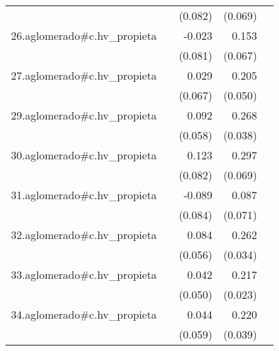 {\begin{longtable}{l*{4}{D{.}{.}{-1}}}
            &                     &     (0.082)         &     (0.069)         &                     \\
\addlinespace
26.aglomerado#c.hv\_propieta&                     &      -0.023         &       0.153\sym{*}  &                     \\
            &                     &     (0.081)         &     (0.067)         &                     \\
\addlinespace
27.aglomerado#c.hv\_propieta&                     &       0.029         &       0.205\sym{***}&                     \\
            &                     &     (0.067)         &     (0.050)         &                     \\
\addlinespace
29.aglomerado#c.hv\_propieta&                     &       0.092         &       0.268\sym{***}&                     \\
            &                     &     (0.058)         &     (0.038)         &                     \\
\addlinespace
30.aglomerado#c.hv\_propieta&                     &       0.123         &       0.297\sym{***}&                     \\
            &                     &     (0.082)         &     (0.069)         &                     \\
\addlinespace
31.aglomerado#c.hv\_propieta&                     &      -0.089         &       0.087         &                     \\
            &                     &     (0.084)         &     (0.071)         &                     \\
\addlinespace
32.aglomerado#c.hv\_propieta&                     &       0.084         &       0.262\sym{***}&                     \\
            &                     &     (0.056)         &     (0.034)         &                     \\
\addlinespace
33.aglomerado#c.hv\_propieta&                     &       0.042         &       0.217\sym{***}&                     \\
            &                     &     (0.050)         &     (0.023)         &                     \\
\addlinespace
34.aglomerado#c.hv\_propieta&                     &       0.044         &       0.220\sym{***}&                     \\
            &                     &     (0.059)         &     (0.039)         &                     \\

\end{longtable}}
